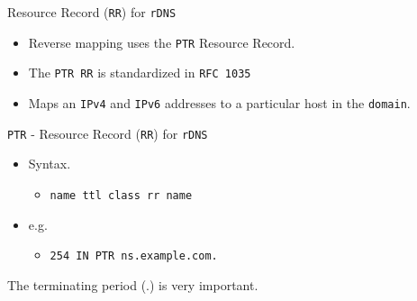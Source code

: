 \documentclass[xcolor=table]{beamer}
\begin{document}
\begin{frame}{Resource Record (\texttt{RR}) for \texttt{rDNS}}
  \begin{itemize}
    \item Reverse mapping uses the \texttt{PTR} Resource Record.
    \item The \texttt{PTR RR} is standardized in \texttt{RFC 1035}
    \item Maps an \texttt{IPv4} and \texttt{IPv6} addresses to a particular host in the \texttt{domain}.
  \end{itemize}
\end{frame}

\begin{frame}{\texttt{PTR} - Resource Record (\texttt{RR}) for \texttt{rDNS}}
  \begin{itemize}
    \item Syntax.
      \begin{itemize}
        \item \texttt{name ttl class rr name}
      \end{itemize}
    \item e.g.
      \begin{itemize}
        \item \texttt{254     IN PTR ns.example.com.}
      \end{itemize}
  \end{itemize}
  \begin{tcolorbox}[title={\textbf{NOTE:}}]
    \begin{center}
      \scriptsize The terminating period (.) is very important.
    \end{center}
  \end{tcolorbox}
\end{frame}
\end{document}
